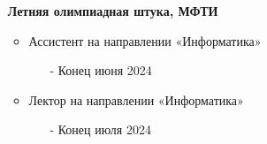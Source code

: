 \documentclass[10pt,a4paper]{altacv}
\begin{document}
\begin{itemize}
\item[] \textbf{Летняя олимпиадная штука, МФТИ}
\begin{itemize}
    \item Ассистент на направлении «Информатика»
    \begin{itemize}
        \item[-] Конец июня 2024
    \end{itemize}
        \item Лектор на направлении «Информатика»
    \begin{itemize}
        \item[-] Конец июля 2024
    \end{itemize}
\end{itemize}

\end{itemize}
\clearpage
\end{document}
